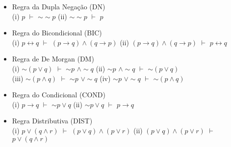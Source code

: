 \documentclass[12pt,a4paper,oneside]{article}
\begin{document}
\begin{itemize}
	\item Regra da Dupla Negação (DN) \\
	(i) $p$ $\vdash$ $\sim \sim p$ \hspace*{0.5cm} (ii)  $\sim \sim p$ $\vdash$ $p$
	\item Regra do Bicondicional (BIC) \\
	(i) $p \leftrightarrow q$ $\vdash$ $(p \rightarrow q) \wedge (q \rightarrow p)$ \hspace*{0.5cm} (ii)  $(p \rightarrow q) \wedge (q \rightarrow p)$ $\vdash$ $p \leftrightarrow q$
	\item Regra de De Morgan (DM) \\
	(i) $\sim (p \vee q)$ $\vdash$ $\sim p$ $\wedge \sim q$ \hspace*{0.5cm} (ii) $\sim p$ $\wedge \sim q$ $\vdash$ $\sim (p \vee q)$ \\
	(iii) $\sim (p \wedge q)$ $\vdash$ $\sim p$ $\vee \sim q$ \hspace*{0.5cm} (iv) $\sim p$ $\vee \sim q$ $\vdash$ $\sim (p \wedge q)$
	\item Regra do Condicional (COND) \\
	(i) $p \rightarrow q$ $\vdash$ $\sim p \vee q$ \hspace*{0.5cm} (ii)  $\sim p \vee q$ $\vdash$ $p \rightarrow q$
	\item Regra Distributiva (DIST) \\
	(i) $p \vee (q \wedge r)$ $\vdash$ $(p \vee q) \wedge (p \vee r)$ \hspace*{0.5cm} (ii)  $(p \vee q) \wedge (p \vee r)$ $\vdash$ $p \vee (q \wedge r)$  
\end{itemize}
\end{document}
